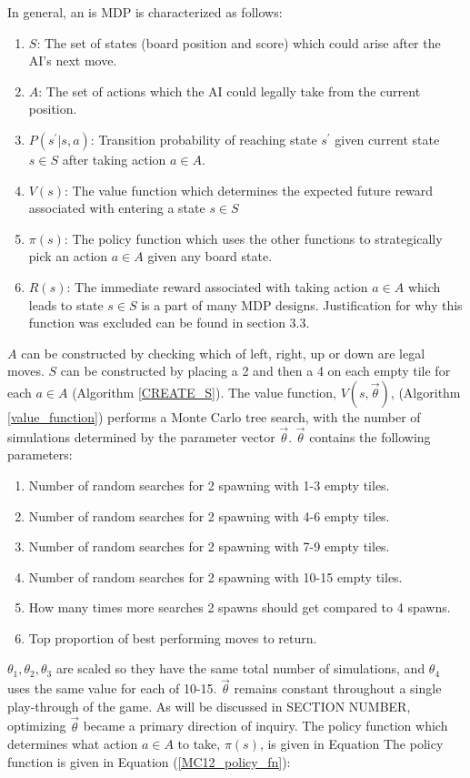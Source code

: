 \documentclass{article}
\begin{document}
In general, an is MDP is characterized as follows:
\begin{enumerate}
	\item $S$: The set of states (board position and score) which could arise after the AI's next move.
	\item $A$: The set of actions which the AI could legally take from the current position.
	\item $P(s^\prime | s, a)$: Transition probability of reaching state $s^\prime$ given current state $s \in S$ after taking action $a \in A$.
	\item $V(s)$: The value function which determines the expected future reward associated with entering a state $s \in S$
	\item $\pi(s)$: The policy function which uses the other functions to strategically pick an action $a \in A$ given any board state.
	\item $R(s)$: The immediate reward associated with taking action $a \in A$ which leads to state $s \in S$ is a part of many MDP designs.  Justification for why this function was excluded can be found in section 3.3.
\end{enumerate}

$A$ can be constructed by checking which of left, right, up or down are legal moves. $S$ can be constructed by placing a 2 and then a 4 on each empty tile for each $a \in A$ (Algorithm \ref{CREATE_S}). The value function, $V(s, \vec{\theta})$,  (Algorithm \ref{value_function}) performs a Monte Carlo tree search, with the number of simulations determined by the parameter vector $\vec{\theta}$.  $\vec{\theta}$ contains the following parameters:
\begin{enumerate}
	\item Number of random searches for 2 spawning with 1-3 empty tiles.
	\item Number of random searches for 2 spawning with 4-6 empty tiles.
	\item Number of random searches for 2 spawning with 7-9 empty tiles.
	\item Number of random searches for 2 spawning with 10-15 empty tiles.
	\item How many times more searches 2 spawns should get compared to 4 spawns.
	\item Top proportion of best performing moves to return.
\end{enumerate}

$\theta_1, \theta_2, \theta_3$ are scaled so they have the same total number of simulations, and $\theta_4$ uses the same value for each of 10-15.  $\vec{\theta}$ remains constant throughout a single play-through of the game.  As will be discussed in SECTION NUMBER, optimizing $\vec{\theta}$ became a primary direction of inquiry. The policy function which determines what action $a \in A$ to take, $\pi(s)$, is given in Equation The policy function is given in Equation (\ref{MC12_policy_fn}):
\end{document}
